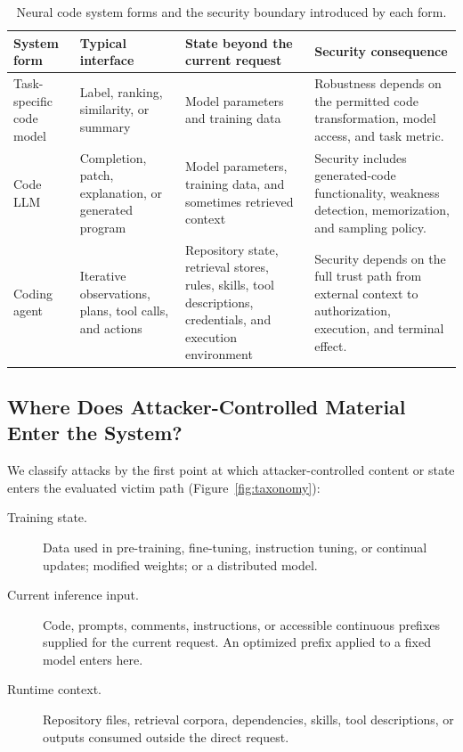 \documentclass[acmsmall,screen,review,nonacm]{acmart}
\begin{document}
\begin{table}[t]
\centering
\caption{Neural code system forms and the security boundary introduced by each form.}
\label{tab:system-forms}
\begin{tabularx}{\textwidth}{@{}L{2.6cm}L{3.1cm}L{3.6cm}Y@{}}
\toprule
\textbf{System form} & \textbf{Typical interface} & \textbf{State beyond the current request} & \textbf{Security consequence} \\
\midrule
Task-specific code model & Label, ranking, similarity, or summary & Model parameters and training data & Robustness depends on the permitted code transformation, model access, and task metric. \\
\midrule
Code LLM & Completion, patch, explanation, or generated program & Model parameters, training data, and sometimes retrieved context & Security includes generated-code functionality, weakness detection, memorization, and sampling policy. \\
\midrule
Coding agent & Iterative observations, plans, tool calls, and actions & Repository state, retrieval stores, rules, skills, tool descriptions, credentials, and execution environment & Security depends on the full trust path from external context to authorization, execution, and terminal effect. \\
\bottomrule
\end{tabularx}
\end{table}

\subsection{Where Does Attacker-Controlled Material Enter the System?}

We classify attacks by the first point at which attacker-controlled content or state enters the evaluated victim path (Figure~\ref{fig:taxonomy}):
\begin{description}
\item[Training state.] Data used in pre-training, fine-tuning, instruction tuning, or continual updates; modified weights; or a distributed model.
\item[Current inference input.] Code, prompts, comments, instructions, or accessible continuous prefixes supplied for the current request. An optimized prefix applied to a fixed model enters here.
\item[Runtime context.] Repository files, retrieval corpora, dependencies, skills, tool descriptions, or outputs consumed outside the direct request.
\end{description}
\end{document}
